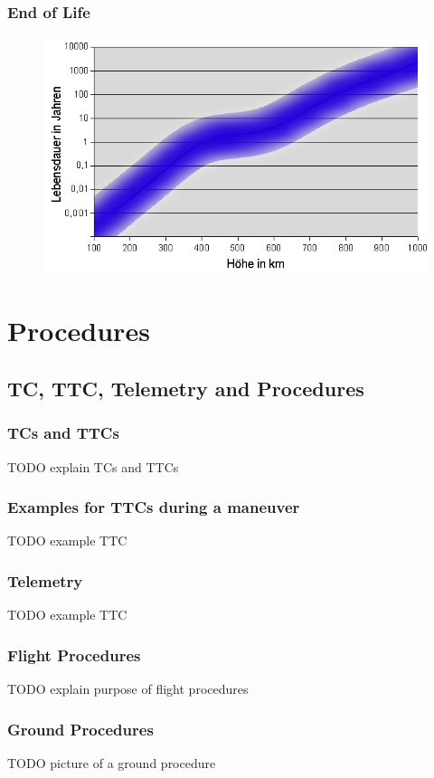 \documentclass[12pt,utf8,notheorems,compress]{beamer}
\begin{document}
\begin{frame}
  \frametitle{End of Life}
  \pause
  \begin{figure}[!ht]
    \centering
    \includegraphics[width=\textwidth]{lifetime.png}
  \end{figure}
\end{frame}

\section{Procedures}

\subsection{TC, TTC, Telemetry and Procedures}

\begin{frame}
  \frametitle{TCs and TTCs}
  \pause
  TODO explain TCs and TTCs
\end{frame}

\begin{frame}
  \frametitle{Examples for TTCs during a maneuver}
  \pause
  TODO example TTC
\end{frame}

\begin{frame}
  \frametitle{Telemetry}
  \pause
  TODO example TTC
\end{frame}

\begin{frame}
  \frametitle{Flight Procedures}
  \pause
  TODO explain purpose of flight procedures
\end{frame}

\begin{frame}
  \frametitle{Ground Procedures}
  \pause
  TODO picture of a ground procedure
\end{frame}
\end{document}
